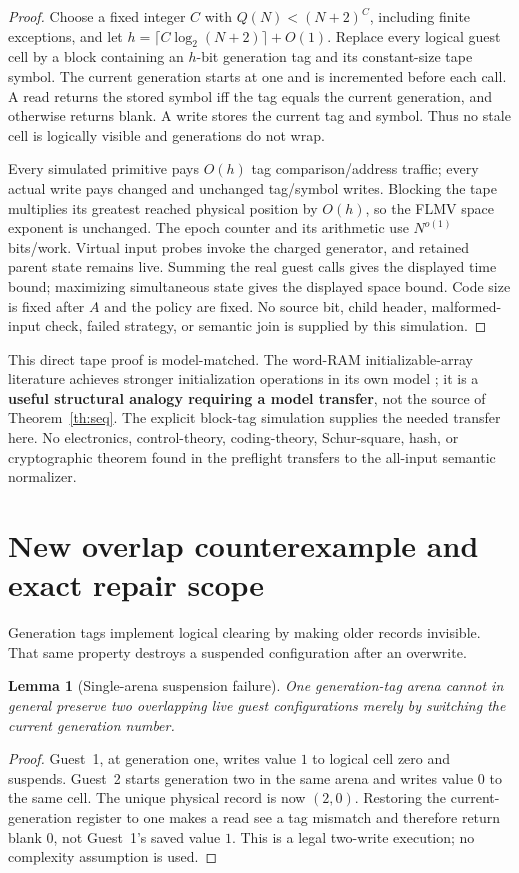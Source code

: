 \documentclass[11pt]{article}
\newtheorem{lemma}[theorem]{Lemma}
\begin{document}
\begin{proof}
Choose a fixed integer $C$ with $Q(N)<(N+2)^C$, including finite exceptions,
and let $h=\lceil C\log_2(N+2)\rceil+O(1)$.  Replace every logical guest cell
by a block containing an $h$-bit generation tag and its constant-size tape
symbol.  The current generation starts at one and is incremented before each
call.  A read returns the stored symbol iff the tag equals the current
generation, and otherwise returns blank.  A write stores the current tag and
symbol.  Thus no stale cell is logically visible and generations do not wrap.

Every simulated primitive pays $O(h)$ tag comparison/address traffic; every
actual write pays changed and unchanged tag/symbol writes.  Blocking the tape
multiplies its greatest reached physical position by $O(h)$, so the FLMV space
exponent is unchanged.  The epoch counter and its arithmetic use
$N^{o(1)}$ bits/work.  Virtual input probes invoke the charged generator, and
retained parent state remains live.  Summing the real guest calls gives the
displayed time bound; maximizing simultaneous state gives the displayed space
bound.  Code size is fixed after $A$ and the policy are fixed.  No source bit,
child header, malformed-input check, failed strategy, or semantic join is
supplied by this simulation.
\end{proof}

This direct tape proof is model-matched.  The word-RAM initializable-array
literature achieves stronger initialization operations in its own model
\cite{navarro,katoh}; it is a \textbf{useful structural analogy requiring a
model transfer}, not the source of Theorem~\ref{th:seq}.  The explicit
block-tag simulation supplies the needed transfer here.  No electronics,
control-theory, coding-theory, Schur-square, hash, or cryptographic theorem
found in the preflight transfers to the all-input semantic normalizer.

\section{New overlap counterexample and exact repair scope}
Generation tags implement logical clearing by making older records invisible.
That same property destroys a suspended configuration after an overwrite.

\begin{lemma}[Single-arena suspension failure]\label{lem:overlap}
One generation-tag arena cannot in general preserve two overlapping live
guest configurations merely by switching the current generation number.
\end{lemma}
\begin{proof}
Guest~1, at generation one, writes value $1$ to logical cell zero and
suspends.  Guest~2 starts generation two in the same arena and writes value
$0$ to the same cell.  The unique physical record is now $(2,0)$.  Restoring
the current-generation register to one makes a read see a tag mismatch and
therefore return blank $0$, not Guest~1's saved value $1$.  This is a legal
two-write execution; no complexity assumption is used.
\end{proof}
\end{document}
